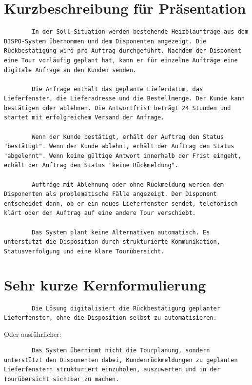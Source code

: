 \documentclass[12pt,a4paper]{article}
\begin{document}
	\section{Kurzbeschreibung für Präsentation}
	
	\begin{lstlisting}
		In der Soll-Situation werden bestehende Heizölaufträge aus dem DISPO-System übernommen und dem Disponenten angezeigt. Die Rückbestätigung wird pro Auftrag durchgeführt. Nachdem der Disponent eine Tour vorläufig geplant hat, kann er für einzelne Aufträge eine digitale Anfrage an den Kunden senden.
		
		Die Anfrage enthält das geplante Lieferdatum, das Lieferfenster, die Lieferadresse und die Bestellmenge. Der Kunde kann bestätigen oder ablehnen. Die Antwortfrist beträgt 24 Stunden und startet mit erfolgreichem Versand der Anfrage.
		
		Wenn der Kunde bestätigt, erhält der Auftrag den Status "bestätigt". Wenn der Kunde ablehnt, erhält der Auftrag den Status "abgelehnt". Wenn keine gültige Antwort innerhalb der Frist eingeht, erhält der Auftrag den Status "keine Rückmeldung".
		
		Aufträge mit Ablehnung oder ohne Rückmeldung werden dem Disponenten als problematische Fälle angezeigt. Der Disponent entscheidet dann, ob er ein neues Lieferfenster sendet, telefonisch klärt oder den Auftrag auf eine andere Tour verschiebt.
		
		Das System plant keine Alternativen automatisch. Es unterstützt die Disposition durch strukturierte Kommunikation, Statusverfolgung und eine klare Tourübersicht.
	\end{lstlisting}
	
	\section{Sehr kurze Kernformulierung}
	
	\begin{lstlisting}
		Die Lösung digitalisiert die Rückbestätigung geplanter Lieferfenster, ohne die Disposition selbst zu automatisieren.
	\end{lstlisting}
	
	Oder ausführlicher:
	
	\begin{lstlisting}
		Das System übernimmt nicht die Tourplanung, sondern unterstützt den Disponenten dabei, Kundenrückmeldungen zu geplanten Lieferfenstern strukturiert einzuholen, auszuwerten und in der Tourübersicht sichtbar zu machen.
	\end{lstlisting}
	
\end{document}

